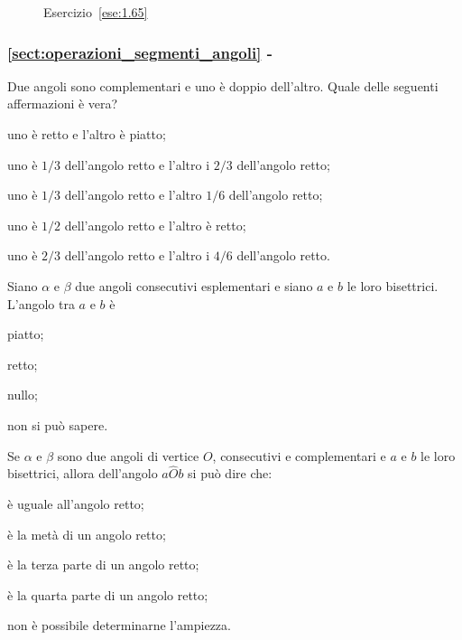 \begin{inaccessibleblock}
 \begin{figure}[htb]
 \centering
 \caption{Esercizio~\ref{ese:1.65}}\label{fig:ese1.65}
\end{figure}
\end{inaccessibleblock}

\begingroup
\hypersetup{linkcolor=black}
\subsubsection*{\ref{sect:operazioni_segmenti_angoli} - 
}
\endgroup

\begin{esercizio}
\label{ese:1.66}
Due angoli sono complementari e uno è doppio dell'altro. Quale delle 
seguenti affermazioni è vera?
\begin{enumeratea}
\item uno è retto e l'altro è piatto;
\item uno è $1/3$ dell'angolo retto e l'altro i $2/3$ dell'angolo 
retto;
\item uno è $1/3$ dell'angolo retto e l'altro $1/6$ dell'angolo retto;
\item uno è $1/2$ dell'angolo retto e l'altro è retto;
\item uno è $2/3$ dell'angolo retto e l'altro i $4/6$ dell'angolo 
retto.
\end{enumeratea}
\end{esercizio}

\begin{esercizio}
\label{ese:1.67}
Siano $\alpha$ e $\beta$ due angoli consecutivi esplementari e siano 
$a$ e $b$ le loro bisettrici. L'angolo tra $a$ e $b$ è
\begin{multicols}{2}
\begin{enumeratea}
\item piatto;
\item retto;
\item nullo;
\item non si può sapere.
\end{enumeratea}
\end{multicols}
\end{esercizio}

\begin{esercizio}
\label{ese:1.68}
Se $\alpha$ e $\beta$ sono due angoli di vertice $O$, consecutivi e 
complementari e $a$ e $b$ le loro bisettrici, allora dell'angolo 
$a\widehat{O}b$ si può dire  che:
\begin{multicols}{2}
\begin{enumeratea}
\item è uguale all'angolo retto;
\item è la metà di un angolo retto;
\item è la terza parte di un angolo retto;
\item è la quarta parte di un angolo retto;
\item non è possibile determinarne l'ampiezza.
\end{enumeratea}
\end{multicols}
\end{esercizio}

